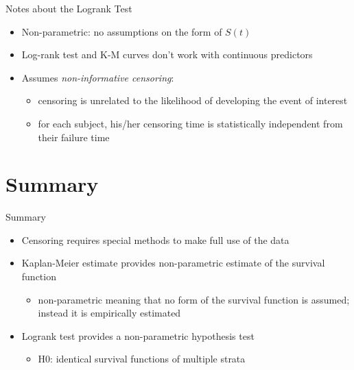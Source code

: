 \documentclass[
  ignorenonframetext,
]{beamer}
\providecommand{\tightlist}{%
  \setlength{\itemsep}{0pt}\setlength{\parskip}{0pt}}
\begin{document}
\begin{frame}{Notes about the Logrank Test}
\protect\hypertarget{notes-about-the-logrank-test}{}

\begin{itemize}
\tightlist
\item
  Non-parametric: no assumptions on the form of \(S(t)\)
\item
  Log-rank test and K-M curves don't work with continuous predictors
\item
  Assumes \emph{non-informative censoring}:

  \begin{itemize}
  \tightlist
  \item
    censoring is unrelated to the likelihood of developing the event of
    interest
  \item
    for each subject, his/her censoring time is statistically
    independent from their failure time
  \end{itemize}
\end{itemize}

\end{frame}

\hypertarget{summary}{%
\section{Summary}\label{summary}}

\begin{frame}{Summary}

\begin{itemize}
\tightlist
\item
  Censoring requires special methods to make full use of the data
\item
  Kaplan-Meier estimate provides non-parametric estimate of the survival
  function

  \begin{itemize}
  \tightlist
  \item
    non-parametric meaning that no form of the survival function is
    assumed; instead it is empirically estimated
  \end{itemize}
\item
  Logrank test provides a non-parametric hypothesis test

  \begin{itemize}
  \tightlist
  \item
    H0: identical survival functions of multiple strata
  \end{itemize}
\end{itemize}

\end{frame}
\end{document}
